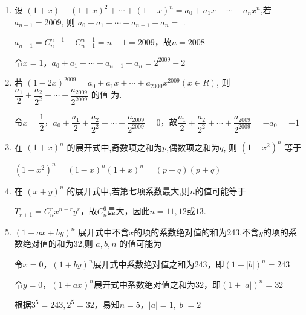 \begin{enumerate}
\begin{jieda}
    代入$n = 8, a_0 = 1$得到答案255.
\end{jieda}

\item 设 $(1+x)+(1+x)^{2} + \cdots + (1+x)^{n} = a_{0} + a_{1}x + \cdots + a_{n}x^{n}$,若 $a_{n-1} = 2009$, 则 $a_{0}+a_{1}+\cdots+a_{n-1}+a_{n}=$ .
\begin{jieda}
    $a_{n-1} = C_n^{n-1} + C_{n-1}^{n-1} = n+1 = 2009$，故$n = 2008$

    令$x = 1$，$a_{0}+a_{1}+\cdots+a_{n-1}+a_{n}=2^{2009}-2$
\end{jieda}

\item 若 $(1-2x)^{2009}=a_{0}+a_{1}x+\cdots+a_{2009}x^{2009}(x\in R)$, 则 $\dfrac{a_{1}}{2}+\dfrac{a_{2}}{2^{2}}+\cdots+\dfrac{a_{2009}}{2^{2009}}$ 的值 为.
\begin{jieda}
    令$x = \dfrac{1}{2}$，$a_0 + \dfrac{a_{1}}{2}+\dfrac{a_{2}}{2^{2}}+\cdots+\dfrac{a_{2009}}{2^{2009}} = 0$，故$\dfrac{a_{1}}{2}+\dfrac{a_{2}}{2^{2}}+\cdots+\dfrac{a_{2009}}{2^{2009}} = -a_0 = -1$ 
\end{jieda}

\item 在 $(1+x)^{n}$ 的展开式中,奇数项之和为$p$,偶数项之和为$q$, 则 $(1-x^{2})^{n}$ 等于 
\begin{jieda}
    $(1-x^{2})^{n} = (1-x)^n(1+x)^n = (p-q)(p+q)$
\end{jieda}

\item 在 $(x+y)^{n}$ 的展开式中,若第七项系数最大,则$n$的值可能等于 
\begin{jieda}
    $T_{r+1} = C_n^rx^{n-r}y^r$，故$C_n^6$最大，因此$n = 11, 12$或$13$.
\end{jieda}

\item $(1+ax+by)^{n}$ 展开式中不含$x$的项的系数绝对值的和为243,不含$y$的项的系数绝对值的和为32,则 $a,b,n$ 的值可能为 
\begin{jieda}
    令$x = 0$，$(1+by)^{n}$展开式中系数绝对值之和为$243$，即$(1+|b|)^{n} = 243$

    令$y = 0$，$(1+ax)^{n}$展开式中系数绝对值之和为$32$，即$(1+|a|)^{n} = 32$

    根据$3^5 = 243, 2^5 = 32$，易知$n = 5$，$|a| = 1, |b| = 2$
\end{jieda}


\end{enumerate}
